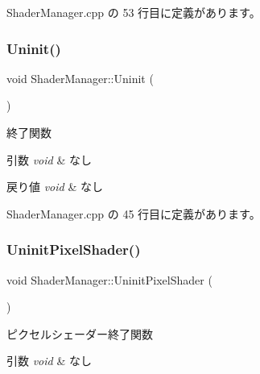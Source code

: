  Shader\+Manager.\+cpp の 53 行目に定義があります。

\mbox{\label{class_shader_manager_afc31a6bbe86e6b57edd7be0972f48ab1}} 
\subsubsection{\texorpdfstring{Uninit()}{Uninit()}}
{\footnotesize\ttfamily void Shader\+Manager\+::\+Uninit (\begin{DoxyParamCaption}{ }\end{DoxyParamCaption})}



終了関数 


\begin{DoxyParams}{引数}
{\em void} & なし \\
\hline
\end{DoxyParams}

\begin{DoxyRetVals}{戻り値}
{\em void} & なし \\
\hline
\end{DoxyRetVals}


 Shader\+Manager.\+cpp の 45 行目に定義があります。

\mbox{\label{class_shader_manager_ae672bb32f27d16fac548a507666facc9}} 
\subsubsection{\texorpdfstring{Uninit\+Pixel\+Shader()}{UninitPixelShader()}}
{\footnotesize\ttfamily void Shader\+Manager\+::\+Uninit\+Pixel\+Shader (\begin{DoxyParamCaption}{ }\end{DoxyParamCaption})\hspace{0.3cm}{\ttfamily [private]}}



ピクセルシェーダー終了関数 


\begin{DoxyParams}{引数}
{\em void} & なし \\
\hline
\end{DoxyParams}

